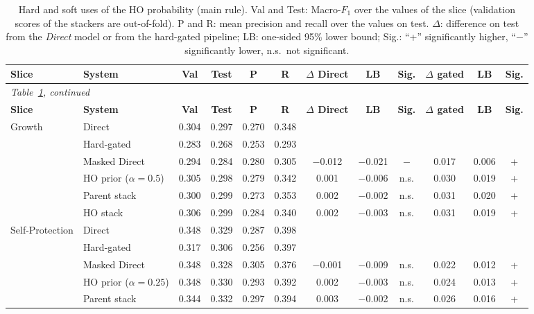 {\setlength{\tabcolsep}{4pt}
{\footnotesize
\begin{longtable}{llcccccccccc}
\caption{Hard and soft uses of the HO probability (main rule). Val and Test: Macro-$F_1$ over the values of the slice (validation scores of the stackers are out-of-fold). P and R: mean precision and recall over the values on test. $\Delta$: difference on test from the \emph{Direct} model or from the hard-gated pipeline; LB: one-sided 95\% lower bound; Sig.: ``+'' significantly higher, ``$-$'' significantly lower, n.s.\ not significant.}\label{tab:s8-soft}\\
\hline
\textbf{Slice} & \textbf{System} & \textbf{Val} & \textbf{Test} & \textbf{P} & \textbf{R} & \textbf{$\Delta$ Direct} & \textbf{LB} & \textbf{Sig.} & \textbf{$\Delta$ gated} & \textbf{LB} & \textbf{Sig.} \\
\hline
\endfirsthead
\multicolumn{12}{l}{\emph{Table~\ref{tab:s8-soft}, continued}}\\
\hline
\textbf{Slice} & \textbf{System} & \textbf{Val} & \textbf{Test} & \textbf{P} & \textbf{R} & \textbf{$\Delta$ Direct} & \textbf{LB} & \textbf{Sig.} & \textbf{$\Delta$ gated} & \textbf{LB} & \textbf{Sig.} \\
\hline
\endhead
\hline
\endfoot
Growth & Direct & 0.304 & 0.297 & 0.270 & 0.348 &  &  &  &  &  &  \\
 & Hard-gated & 0.283 & 0.268 & 0.253 & 0.293 &  &  &  &  &  &  \\
 & Masked Direct & 0.294 & 0.284 & 0.280 & 0.305 & $-$0.012 & $-$0.021 & $-$ & 0.017 & 0.006 & + \\
 & HO prior ($\alpha=0.5$) & 0.305 & 0.298 & 0.279 & 0.342 & 0.001 & $-$0.006 & n.s. & 0.030 & 0.019 & + \\
 & Parent stack & 0.300 & 0.299 & 0.273 & 0.353 & 0.002 & $-$0.002 & n.s. & 0.031 & 0.020 & + \\
 & HO stack & 0.306 & 0.299 & 0.284 & 0.340 & 0.002 & $-$0.003 & n.s. & 0.031 & 0.019 & + \\
Self-Protection & Direct & 0.348 & 0.329 & 0.287 & 0.398 &  &  &  &  &  &  \\
 & Hard-gated & 0.317 & 0.306 & 0.256 & 0.397 &  &  &  &  &  &  \\
 & Masked Direct & 0.348 & 0.328 & 0.305 & 0.376 & $-$0.001 & $-$0.009 & n.s. & 0.022 & 0.012 & + \\
 & HO prior ($\alpha=0.25$) & 0.348 & 0.330 & 0.293 & 0.392 & 0.002 & $-$0.003 & n.s. & 0.024 & 0.013 & + \\
 & Parent stack & 0.344 & 0.332 & 0.297 & 0.394 & 0.003 & $-$0.002 & n.s. & 0.026 & 0.016 & + \\

\end{longtable}}}
